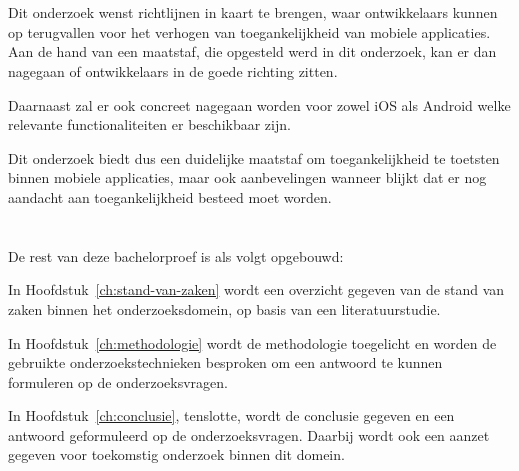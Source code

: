 \section{}
\label{sec:onderzoeksdoelstelling}


Dit onderzoek wenst richtlijnen in kaart te brengen, waar ontwikkelaars kunnen op terugvallen voor het verhogen van toegankelijkheid van mobiele applicaties. Aan de hand van een maatstaf, die opgesteld werd in dit onderzoek, kan er dan nagegaan of ontwikkelaars in de goede richting zitten.

Daarnaast zal er ook concreet nagegaan worden voor zowel iOS als Android welke relevante functionaliteiten er beschikbaar zijn. 

Dit onderzoek biedt dus een duidelijke maatstaf om toegankelijkheid te toetsten binnen mobiele applicaties, maar ook aanbevelingen wanneer blijkt dat er nog aandacht aan toegankelijkheid besteed moet worden.
\section{}
\label{sec:opzet-bachelorproef}


De rest van deze bachelorproef is als volgt opgebouwd:

In Hoofdstuk~\ref{ch:stand-van-zaken} wordt een overzicht gegeven van de stand van zaken binnen het onderzoeksdomein, op basis van een literatuurstudie.

In Hoofdstuk~\ref{ch:methodologie} wordt de methodologie toegelicht en worden de gebruikte onderzoekstechnieken besproken om een antwoord te kunnen formuleren op de onderzoeksvragen.


In Hoofdstuk~\ref{ch:conclusie}, tenslotte, wordt de conclusie gegeven en een antwoord geformuleerd op de onderzoeksvragen. Daarbij wordt ook een aanzet gegeven voor toekomstig onderzoek binnen dit domein.